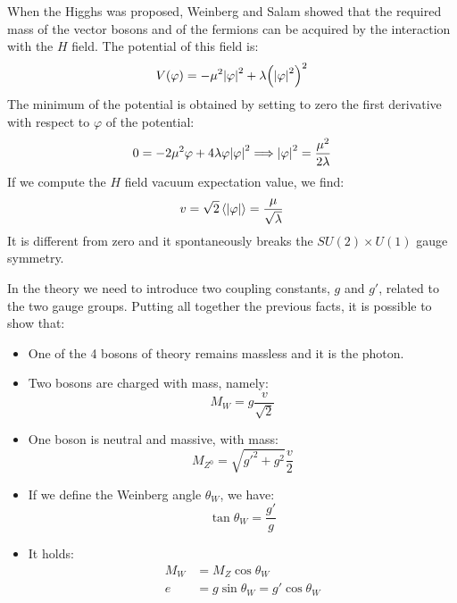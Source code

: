 \documentclass[../../main/main.tex]{subfiles}
\begin{document}

When the Higghs was proposed, Weinberg and Salam showed that the required mass of the vector bosons and of the fermions can be acquired by the interaction with the \( H \) field. The potential of this field is:
\begin{equation}
	V(\varphi)
	=
	-\mu^2 \abs{\varphi}^2 + \lambda \qty(\abs{\varphi}^2)^2
	\label{eq:}
\end{equation}
The minimum of the potential is obtained by setting to zero the first derivative with respect to \( \varphi \) of the potential:
\begin{equation}
	0
	=
	-2\mu^2 \varphi + 4 \lambda \varphi \abs{\varphi}^2
	\Longrightarrow
	\abs{\varphi}^2
	=
	\frac{\mu^2}{2\lambda}
	\label{eq:}
\end{equation}
If we compute the \( H \) field vacuum expectation value, we find:
\begin{equation}
	v
	=
	\sqrt{2} \left\langle \abs{\varphi} \right\rangle
	=
	\frac{\mu}{\sqrt{\lambda}}
	\label{eq:}
\end{equation}
It is different from zero and it spontaneously breaks the \( SU(2) \times U(1) \) gauge symmetry.

In the theory we need to introduce two coupling constants, \( g \) and \( g' \), related to the two gauge groups. Putting all together the previous facts, it is possible to show that:
\begin{itemize}
	\item One of the 4 bosons of theory remains massless and it is the photon.
	\item Two bosons are charged with mass, namely:
		\begin{equation}
			M_W = g \frac{v}{\sqrt{2}}
			\label{eq:}
		\end{equation}
	\item One boson is neutral and massive, with mass:
		\begin{equation}
			M_{Z^0} = \sqrt{g'^2 + g^2} \frac{v}{2}
			\label{eq:}
		\end{equation}
	\item If we define the Weinberg angle \( \theta_W \), we have:
		\begin{equation}
			\tan \theta_W = \frac{g'}{g}
			\label{eq:}
		\end{equation}
	\item It holds:
		\begin{align}
			M_W &= M_Z \cos \theta_W	\\
			e &= g \sin \theta_W = g' \cos \theta_W
		\end{align}
\end{itemize}
\end{document}
